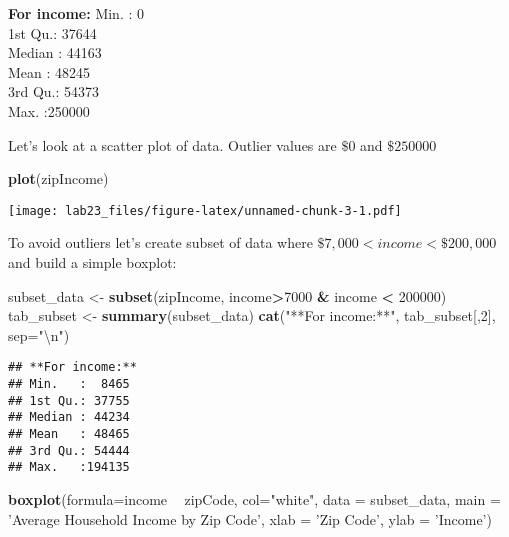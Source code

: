 \documentclass[
]{article}
\newenvironment{Shaded}{\begin{snugshade}}{\end{snugshade}}
\newcommand{\CharTok}[1]{\textcolor[rgb]{0.31,0.60,0.02}{#1}}
\newcommand{\DataTypeTok}[1]{\textcolor[rgb]{0.13,0.29,0.53}{#1}}
\newcommand{\DecValTok}[1]{\textcolor[rgb]{0.00,0.00,0.81}{#1}}
\newcommand{\KeywordTok}[1]{\textcolor[rgb]{0.13,0.29,0.53}{\textbf{#1}}}
\newcommand{\NormalTok}[1]{#1}
\newcommand{\OperatorTok}[1]{\textcolor[rgb]{0.81,0.36,0.00}{\textbf{#1}}}
\newcommand{\StringTok}[1]{\textcolor[rgb]{0.31,0.60,0.02}{#1}}
\begin{document}
\textbf{For income:} Min. : 0\\
1st Qu.: 37644\\
Median : 44163\\
Mean : 48245\\
3rd Qu.: 54373\\
Max. :250000

Let's look at a scatter plot of data. Outlier values are \(\$0\) and
\(\$250000\)

\begin{Shaded}
\begin{Highlighting}[]
\KeywordTok{plot}\NormalTok{(zipIncome)}
\end{Highlighting}
\end{Shaded}

\texttt{[image: lab23\_files/figure-latex/unnamed-chunk-3-1.pdf]}

To avoid outliers let's create subset of data where
\(\$7,000 < income < \$200,000\) and build a simple boxplot:

\begin{Shaded}
\begin{Highlighting}[]
\NormalTok{subset_data <-}\StringTok{ }\KeywordTok{subset}\NormalTok{(zipIncome, income}\OperatorTok{>}\DecValTok{7000} \OperatorTok{&}\StringTok{ }\NormalTok{income }\OperatorTok{<}\StringTok{ }\DecValTok{200000}\NormalTok{)}
\NormalTok{tab_subset <-}\StringTok{ }\KeywordTok{summary}\NormalTok{(subset_data)}
\KeywordTok{cat}\NormalTok{(}\StringTok{"**For income:**"}\NormalTok{, tab_subset[,}\DecValTok{2}\NormalTok{], }\DataTypeTok{sep=}\StringTok{"}\CharTok{\textbackslash{}n}\StringTok{"}\NormalTok{)}
\end{Highlighting}
\end{Shaded}

\begin{verbatim}
## **For income:**
## Min.   :  8465  
## 1st Qu.: 37755  
## Median : 44234  
## Mean   : 48465  
## 3rd Qu.: 54444  
## Max.   :194135
\end{verbatim}

\begin{Shaded}
\begin{Highlighting}[]
\KeywordTok{boxplot}\NormalTok{(}\DataTypeTok{formula=}\NormalTok{income }\OperatorTok{~}\StringTok{ }\NormalTok{zipCode, }\DataTypeTok{col=}\StringTok{"white"}\NormalTok{, }\DataTypeTok{data =}\NormalTok{ subset_data, }\DataTypeTok{main =} \StringTok{'Average Household Income by Zip Code'}\NormalTok{, }\DataTypeTok{xlab =} \StringTok{'Zip Code'}\NormalTok{, }\DataTypeTok{ylab =} \StringTok{'Income'}\NormalTok{)}
\end{Highlighting}
\end{Shaded}
\end{document}

